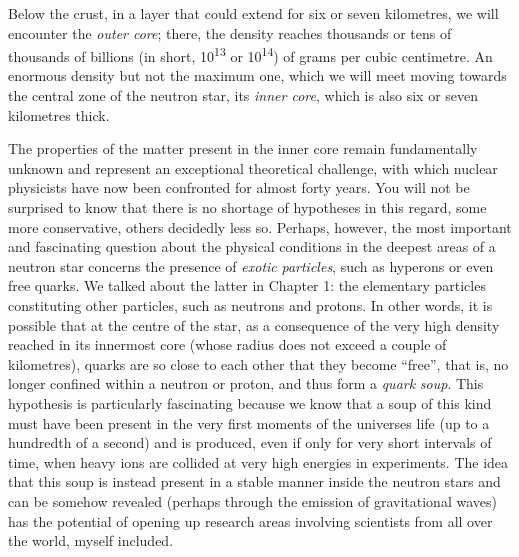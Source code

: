 Below the crust, in a layer that could extend for six or seven kilometres, we will
encounter the \emph{outer core}; there, the density reaches thousands or tens of
thousands of billions (in short, 10\textsuperscript{13} or 10\textsuperscript{14}) of
grams per cubic centimetre. An enormous density but not the maximum one, which we will
meet moving towards the central zone of the neutron star, its \emph{inner core}, which
is also six or seven kilometres thick.

The properties of the matter present in the inner core remain fundamentally unknown and
represent an exceptional theoretical challenge, with which nuclear physicists have now
been confronted for almost forty years. You will not be surprised to know that there is
no shortage of hypotheses in this regard, some more conservative, others decidedly less
so. Perhaps, however, the most important and fascinating question about the physical
conditions in the deepest areas of a neutron star concerns the presence of
\emph{exotic} \emph{particles}, such as hyperons or even free quarks.
We talked about the latter in Chapter 1: the elementary particles constituting other
particles, such as neutrons and protons. In other words, it is possible that at the
centre of the star, as a consequence of the very high density reached in its innermost
core (whose radius does not exceed a couple of kilometres), quarks are so close to each
other that they become ``free'', that is, no longer confined within a neutron or proton,
and thus form a \emph{quark} \emph{soup}. This
hypothesis is particularly fascinating because we know that a soup of this kind must
have been present in the very first moments of the universe\textquotesingle s life (up
to a hundredth of a second) and is produced, even if only for very short intervals of
time, when heavy ions are collided at very high energies in
experiments. The idea that this soup is instead present in a stable
manner inside the neutron stars and can be somehow revealed (perhaps through the
emission of gravitational waves) has the potential of opening up research areas
involving scientists from all over the world, myself included.

